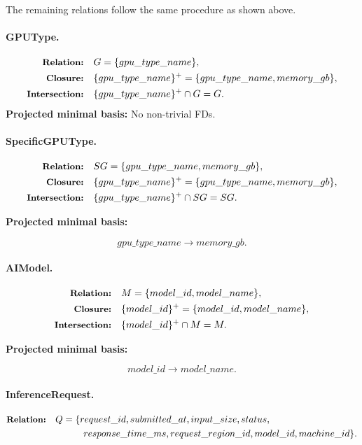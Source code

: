 \documentclass[11pt]{article}
\newcommand{\fd}{\rightarrow}
\newcommand{\projlabel}[1]{\text{\small\bfseries #1}}
\begin{document}
The remaining relations follow the same procedure as shown above.

\paragraph{GPUType.}
\begin{align*}
\projlabel{Relation:} &\quad G = \{gpu\_type\_name\},\\
\projlabel{Closure:} &\quad \{gpu\_type\_name\}^{+}
= \{gpu\_type\_name, memory\_gb\},\\
\projlabel{Intersection:} &\quad \{gpu\_type\_name\}^{+} \cap G = G.
\end{align*}
\noindent\textbf{Projected minimal basis:} No non-trivial FDs.

\paragraph{SpecificGPUType.}
\begin{align*}
\projlabel{Relation:} &\quad SG = \{gpu\_type\_name, memory\_gb\},\\
\projlabel{Closure:} &\quad \{gpu\_type\_name\}^{+}
= \{gpu\_type\_name, memory\_gb\},\\
\projlabel{Intersection:} &\quad \{gpu\_type\_name\}^{+} \cap SG = SG.
\end{align*}
\begin{center}
    \textbf{Projected minimal basis:}
\end{center}
\[
gpu\_type\_name \fd memory\_gb.
\]

\paragraph{AIModel.}
\begin{align*}
\projlabel{Relation:} &\quad M = \{model\_id, model\_name\},\\
\projlabel{Closure:} &\quad \{model\_id\}^{+}
= \{model\_id, model\_name\},\\
\projlabel{Intersection:} &\quad \{model\_id\}^{+} \cap M = M.
\end{align*}

\begin{center}
    \textbf{Projected minimal basis:}
\end{center}
\[
model\_id \fd model\_name.
\]

\paragraph{InferenceRequest.}
\begin{align*}
\projlabel{Relation:} &\quad Q = \{request\_id, submitted\_at, input\_size, status,\\
&\qquad\qquad response\_time\_ms, request\_region\_id, model\_id, machine\_id\}.
\end{align*}
\end{document}
